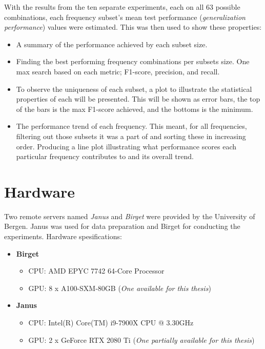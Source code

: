         With the results from the ten separate experiments, each on all 63 possible combinations, each frequency subset's mean test performance (\textit{generalization performance}) values were estimated. This was then used to show these properties:
        
        
        \begin{itemize}
            \item A summary of the performance achieved by each subset size.
            \item Finding the best performing frequency combinations per subsets size. One max search based on each metric; F1-score, precision, and recall.
            \item To observe the uniqueness of each subset, a plot to illustrate the statistical properties of each will be presented. This will be shown as error bars, the top of the bars is the max F1-score achieved, and the bottoms is the minimum. %
            \item The performance trend of each frequency. This meant, for all frequencies, filtering out those subsets it was a part of and sorting these in increasing order. Producing a line plot illustrating what performance scores each particular frequency contributes to and its overall trend.
        \end{itemize}
    


\section{Hardware} \label{hardware}
    Two remote servers named \textit{Janus} and \textit{Birget} were provided by the University of Bergen. Janus was used for data preparation and Birget for conducting the experiments. Hardware spesifications: 
\begin{itemize}
  \item \textbf{Birget}
  \begin{itemize}
    \item CPU: AMD EPYC 7742 64-Core Processor
    \item GPU: 8 x A100-SXM-80GB (\textit{One available for this thesis})
  \end{itemize}
  \item \textbf{Janus}
  \begin{itemize}
    \item CPU: Intel(R) Core(TM) i9-7900X CPU @ 3.30GHz
    \item GPU: 2 x GeForce RTX 2080 Ti (\textit{One partially available for this thesis})
  \end{itemize}
\end{itemize}
